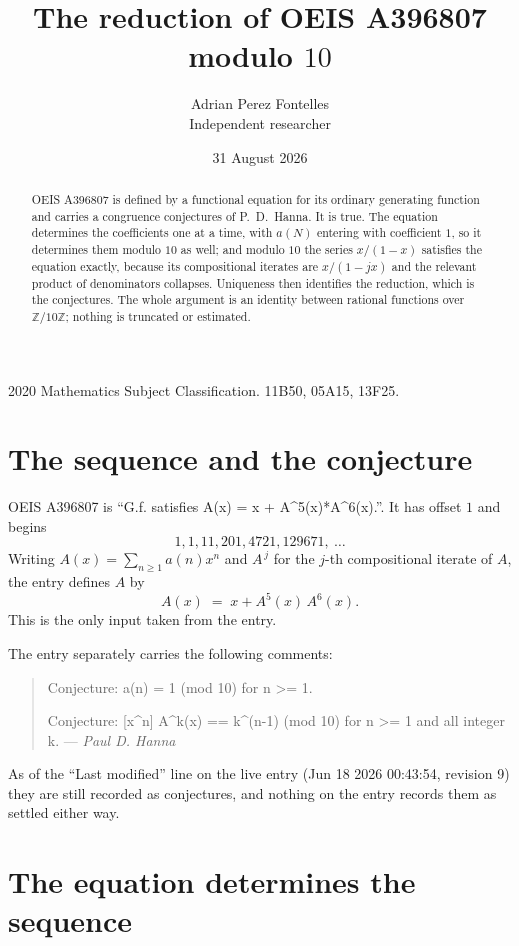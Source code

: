 \documentclass[11pt,a4paper]{article}
\title{The reduction of OEIS A396807 modulo $10$}
\author{Adrian Perez Fontelles\\ \small Independent researcher}
\date{31 August 2026}
\theoremstyle{plain}
\theoremstyle{definition}
\begin{document}
\maketitle

\begin{abstract}
OEIS A396807 is defined by a functional equation for its ordinary generating function and
carries a congruence conjectures of P.~D.~Hanna. It is true. The equation determines the
coefficients one at a time, with $a(N)$ entering with coefficient $1$, so it determines
them modulo $10$ as well; and modulo $10$ the series $x/(1-x)$ satisfies the equation
exactly, because its compositional iterates are $x/(1-jx)$ and the relevant product of
denominators collapses. Uniqueness then identifies the reduction, which is the conjectures.
The whole argument is an identity between rational functions over
$\mathbb{Z}/10\mathbb{Z}$; nothing is truncated or estimated.
\end{abstract}

\noindent\small 2020 Mathematics Subject Classification. 11B50, 05A15, 13F25.\normalsize

\section{The sequence and the conjecture}

OEIS A396807 is ``G.f. satisfies A(x) = x + A\^{}5(x)*A\^{}6(x).''. It has offset $1$ and begins
\[
1, 1, 11, 201, 4721, 129671,\ \dots
\]
Writing $A(x)=\sum_{n\ge1}a(n)x^{n}$ and $A^{\,j}$ for the $j$-th compositional
iterate of $A$, the entry defines $A$ by
\begin{equation}\label{eq:fe}
A(x)\;=\;x+A^{5}(x)\,A^{6}(x) .
\end{equation}
This is the only input taken from the entry.

The entry separately carries the following comments:
\begin{quote}\small
Conjecture: a(n) = 1 (mod 10) for n >= 1.

Conjecture: [x\^{}n] A\^{}k(x) == k\^{}(n-1) (mod 10) for n >= 1 and all integer k. --- \emph{Paul D. Hanna}
\end{quote}
As of the ``Last modified'' line on the live entry (Jun 18 2026 00:43:54, revision 9) they are
still recorded as conjectures, and nothing on the entry records
them as settled either way. 

\section{The equation determines the sequence}
\end{document}
